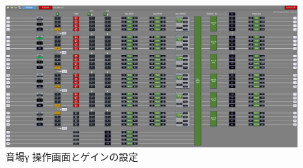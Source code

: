 \documentclass[11pt,a4j]{jreport}
\begin{document}
\begin{figure}[H]
  \centering
  \includegraphics[width=.9\linewidth]{images/experimentField/afcParameters/03gamma/01overall.jpg}
  \caption{音場γ 操作画面とゲインの設定}
  \label{fig:gamma操作画面}
\end{figure}
\end{document}
